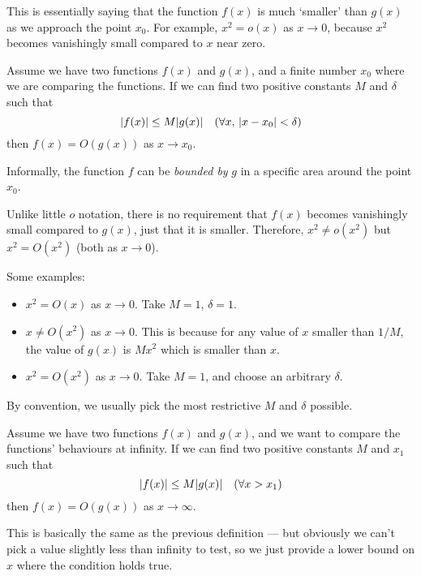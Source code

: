 This is essentially saying that the function $f(x)$ is much `smaller' than $g(x)$ as we approach the point $x_0$. For example, $x^2 = o(x)$ as $x \to 0$, because $x^2$ becomes vanishingly small compared to $x$ near zero.

\begin{definition}
	Assume we have two functions $f(x)$ and $g(x)$, and a finite number $x_0$ where we are comparing the functions. If we can find two positive constants $M$ and $\delta$ such that
	\begin{equation}
		\abs{f(x)} \leq M\abs{g(x)} \quad(\forall x,\, \abs{x-x_0} < \delta)
	\end{equation}
	then $f(x) = O(g(x))$ as $x \to x_0$.
\end{definition}
Informally, the function $f$ can be \textit{bounded by} $g$ in a specific area around the point $x_0$.

Unlike little $o$ notation, there is no requirement that $f(x)$ becomes vanishingly small compared to $g(x)$, just that it is smaller. Therefore, $x^2 \neq o(x^2)$ but $x^2 = O(x^2)$ (both as $x \to 0$).

Some examples:
\begin{itemize}
	\item $x^2 = O(x)$ as $x \to 0$. Take $M = 1$, $\delta = 1$.
	\item $x \neq O(x^2)$ as $x \to 0$. This is because for any value of $x$ smaller than $1/M$, the value of $g(x)$ is $Mx^2$ which is smaller than $x$.
	\item $x^2 = O(x^2)$ as $x \to 0$. Take $M = 1$, and choose an arbitrary $\delta$.
\end{itemize}

By convention, we usually pick the most restrictive $M$ and $\delta$ possible.

\begin{definition}
	Assume we have two functions $f(x)$ and $g(x)$, and we want to compare the functions' behaviours at infinity. If we can find two positive constants $M$ and $x_1$ such that
	\begin{equation}\label{bigoinf}
		\abs{f(x)} \leq M\abs{g(x)} \quad(\forall x > x_1)
	\end{equation}
	then $f(x) = O(g(x))$ as $x \to \infty$.
\end{definition}

This is basically the same as the previous definition --- but obviously we can't pick a value slightly less than infinity to test, so we just provide a lower bound on $x$ where the condition holds true.

